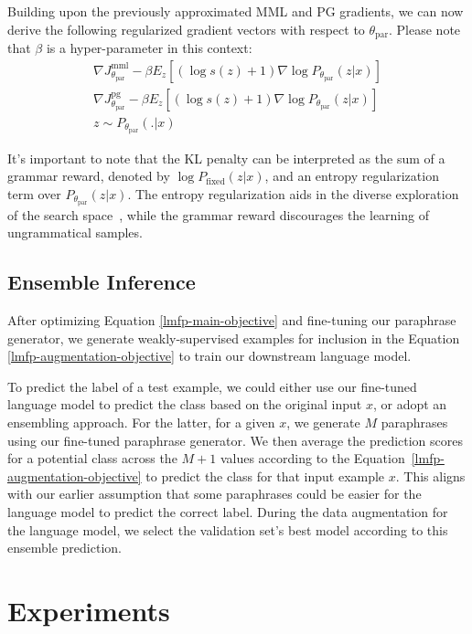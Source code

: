 \documentclass[11pt]{article}
\begin{document}
Building upon the previously approximated MML and PG gradients, we can now derive the following regularized gradient vectors with respect to $\theta_{\text{par}}$. Please note that $\beta$ is a hyper-parameter in this context:
\begin{multline}
\nabla J^{\text{mml}}_{\theta_{\text{par}}} - \beta E_{z} [(\log s(z) + 1) \nabla \log P_{\theta_{\text{par}}} (z | x)] \\
\nabla J^{\text{pg}}_{\theta_{\text{par}}} - \beta E_{z} [(\log s(z) + 1) \nabla \log P_{\theta_{\text{par}}} (z | x)] \\
z \sim P_{\theta_{\text{par}}}(.|x)
\label{lmfp-expect-ppo-gradient}
\end{multline}

It's important to note that the KL penalty can be interpreted as the sum of a grammar reward, denoted by $\log P_{\text{fixed}}(z|x)$, and an entropy regularization term over $P_{\theta_{\text{par}}} (z | x)$. The entropy regularization aids in the diverse exploration of the search space~\cite{DBLP:journals/corr/MnihBMGLHSK16}, while the grammar reward discourages the learning of ungrammatical samples.

\subsection{Ensemble Inference}
\label{ensemble-inference}
After optimizing Equation \ref{lmfp-main-objective} and fine-tuning our paraphrase generator, we generate weakly-supervised examples for inclusion in the Equation \ref{lmfp-augmentation-objective} to train our downstream language model.

To predict the label of a test example, we could either use our fine-tuned language model to predict the class based on the original input $x$, or adopt an ensembling approach. For the latter, for a given $x$, we generate $M$ paraphrases using our fine-tuned paraphrase generator. We then average the prediction scores for a potential class across the $M+1$ values according to the Equation~\ref{lmfp-augmentation-objective} to predict the class for that input example $x$. This aligns with our earlier assumption that some paraphrases could be easier for the language model to predict the correct label. During the data augmentation for the language model, we select the validation set's best model according to this ensemble prediction.

\section{Experiments}
\end{document}
